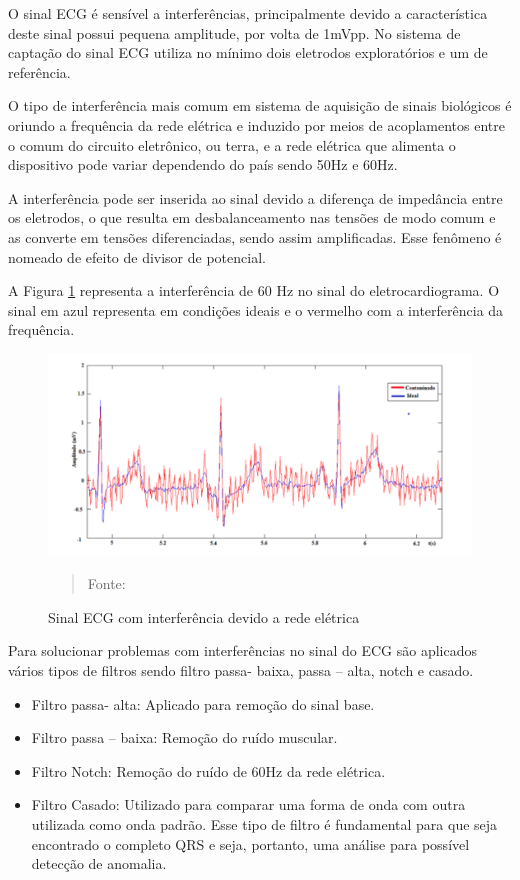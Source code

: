 \documentclass[12pt, a4paper]{article}
\begin{document}
\hspace*{0.8cm}O sinal ECG é sensível a interferências, principalmente devido a característica deste sinal possui pequena amplitude, por volta de 1mVpp. No sistema de captação do sinal ECG utiliza no mínimo dois eletrodos exploratórios e um de referência.

O tipo de interferência mais comum em sistema de aquisição de sinais biológicos é oriundo a frequência da rede elétrica e induzido por meios de acoplamentos entre o comum do circuito eletrônico, ou terra, e a rede elétrica que alimenta o dispositivo  pode variar dependendo do país sendo  50Hz e 60Hz.

A interferência pode ser inserida ao sinal devido a diferença de impedância entre os eletrodos, o que resulta em desbalanceamento nas tensões de modo comum e as converte em tensões diferenciadas, sendo assim amplificadas. Esse fenômeno é nomeado de efeito de divisor de potencial.\cite{webster}

A Figura \ref{fig:tri}  representa a interferência de 60 Hz no sinal do eletrocardiograma. O sinal em azul representa em condições ideais e o vermelho com a interferência da frequência.

\begin{figure}[!htb]
\begin{center}
			\caption{Sinal ECG com interferência devido a rede elétrica}
			\includegraphics[width=.5\textwidth]{Figuras/freq.PNG}
            \vspace*{\fill} 
            \begin{quote} 
            \centering 
            Fonte: \cite{android}
            \end{quote}
            \vspace*{\fill}
			\label{fig:tri}
\end{center}
\end{figure}

Para solucionar problemas com interferências no sinal do ECG são aplicados vários tipos de filtros sendo filtro passa- baixa, passa – alta, notch e casado.
\begin{itemize}
\item Filtro passa- alta: Aplicado para remoção do sinal base.
\item Filtro passa – baixa: Remoção do ruído muscular.
\item Filtro Notch:  Remoção do ruído de 60Hz da rede elétrica.
\item Filtro Casado: Utilizado para comparar uma forma de onda com outra utilizada como onda padrão. Esse tipo de filtro é fundamental para que seja encontrado o completo QRS e seja, portanto, uma análise para possível detecção de anomalia. 

\end{itemize}
\end{document}
